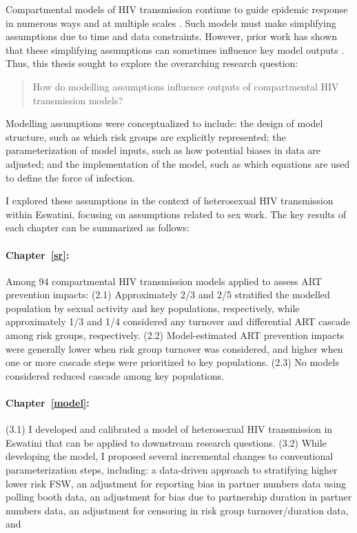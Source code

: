 Compartmental models of HIV transmission
continue to guide epidemic response in numerous ways and at multiple scales
\cite{Stover2021,Phillips2022,TenBrink2022}.
Such models must make simplifying assumptions due to time and data constraints.
However, prior work has shown that these simplifying assumptions
can sometimes influence key model outputs
\cite{Hontelez2013,Johnson2016mf,Suen2017,Knight2020}.
Thus, this thesis sought to explore the overarching research question:
\begin{quote}
  How do modelling assumptions influence outputs of compartmental HIV transmission models?
\end{quote}
Modelling assumptions were conceptualized to include:
the design of model structure, such as which risk groups are explicitly represented;
the parameterization of model inputs, such as how potential biases in data are adjusted; and
the implementation of the model, such as which equations are used to define the force of infection.
\par
I explored these assumptions in the context of heterosexual HIV transmission within Eswatini,
focusing on assumptions related to sex work.
The key results of each chapter can be summarized as follows:
\newcommand{\chpar}[1]{\paragraph{Chapter~\ref{#1}: \nameref*{#1}}}
\chpar{sr}
Among 94 compartmental HIV transmission models
applied to assess ART prevention impacts:
(2.1) Approximately 2/3 and 2/5 stratified the modelled population
by sexual activity and key populations, respectively, while
approximately 1/3 and 1/4 considered
any turnover and differential ART cascade among risk groups, respectively.
(2.2) Model-estimated ART prevention impacts were generally
lower when risk group turnover was considered, and
higher when one or more cascade steps were prioritized to key populations.
(2.3) No models considered reduced cascade among key populations.
\chpar{model}
(3.1) I developed and calibrated a model of heterosexual HIV transmission in Eswatini
that can be applied to downstream research questions.
(3.2) While developing the model,
I proposed several incremental changes to conventional parameterization steps, including:
a data-driven approach to stratifying higher \vs lower risk FSW,
an adjustment for reporting bias in partner numbers data using polling booth data,
an adjustment for bias due to partnership duration in partner numbers data,
an adjustment for censoring in risk group turnover/duration data, and
